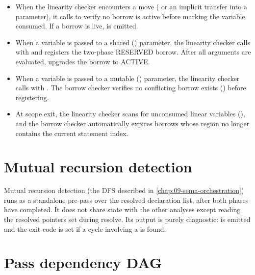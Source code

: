 \begin{itemize}
\item When the linearity checker encounters a move ( or an
  implicit transfer into a  parameter), it calls
   to verify no borrow is active
  before marking the variable consumed.  If a borrow is live, 
  is emitted.

\item When a variable is passed to a shared () parameter,
  the linearity checker calls  with 
  and registers the two-phase RESERVED borrow.  After all arguments are
  evaluated,  upgrades the borrow to ACTIVE.

\item When a variable is passed to a mutable () parameter,
  the linearity checker calls  with .
  The borrow checker verifies no conflicting borrow exists () before
  registering.

\item At scope exit, the linearity checker scans  for
  unconsumed linear variables (), and the borrow checker
  automatically expires borrows whose region no longer contains the current
  statement index.
\end{itemize}

\section{Mutual recursion detection}
\label{sec:ci-mrec}

\pnum
Mutual recursion detection (the DFS described in \cref{chap:09-sema-orchestration})
runs as a standalone pre-pass over the resolved declaration list, after both
phases have completed.  It does not share state with the other analyses except
reading the resolved  pointers set during resolve.  Its output is
purely diagnostic:  is emitted and the exit code is set if a cycle
involving a  is found.

\section{Pass dependency DAG}
\label{sec:ci-dag}

